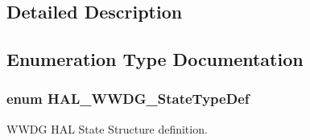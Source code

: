 \subsection{Detailed Description}


\subsection{Enumeration Type Documentation}
\subsubsection[{\texorpdfstring{H\+A\+L\+\_\+\+W\+W\+D\+G\+\_\+\+State\+Type\+Def}{HAL_WWDG_StateTypeDef}}]{\setlength{\rightskip}{0pt plus 5cm}enum {\bf H\+A\+L\+\_\+\+W\+W\+D\+G\+\_\+\+State\+Type\+Def}}\hypertarget{group___w_w_d_g___exported___types_ga0dbbade5e745711745e5f9cc10991301}{}\label{group___w_w_d_g___exported___types_ga0dbbade5e745711745e5f9cc10991301}


W\+W\+DG H\+AL State Structure definition. 

